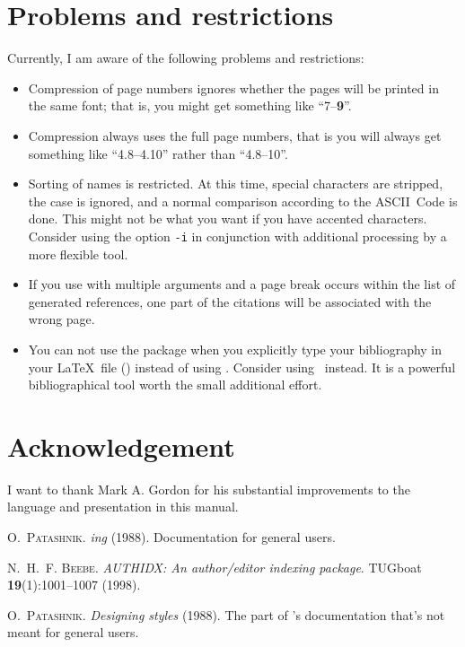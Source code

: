 \documentclass[a4paper]{article}
\newcommand{\cmdline}[1]{\texttt{#1}}
\newcommand{\option}[1]{\cmdline{#1}}
\newcommand{\ltxinp}[1]{\texttt{\string#1}}
\begin{document}
\section{Problems and restrictions}

Currently, I am aware of the following problems and restrictions:
\begin{itemize}
\item Compression of page numbers ignores whether the pages will be printed in
  the same font; that is, you might get something like ``7--\textbf{9}''.
\item Compression always uses the full page numbers, that is you will always
  get something like ``4.8--4.10'' rather than ``4.8--10''.
\item Sorting of names is restricted.  At this time, special characters are
  stripped, the case is ignored, and a normal comparison according to the
  ASCII~Code is done.  This might not be what you want if you have accented
  characters.  Consider using the option \option{-i} in conjunction with
  additional processing by a more flexible tool.
\item If you use \ltxinp{\aicite} with multiple arguments and a page break
  occurs within the list of generated references, one part of the citations
  will be associated with the wrong page.
\item You can not use the package when you explicitly type your bibliography in
  your \LaTeX\ file (\ltxinp{\bibitem}) instead of using \BibTeX. Consider
  using \BibTeX\ instead.  It is a powerful bibliographical tool worth the
  small additional effort.
\end{itemize}

\section{Acknowledgement}

I want to thank Mark A. Gordon for his substantial improvements to the language
and presentation in this manual.


\begin{thebibliography}{3}

\textsc{O.~Patashnik}.
\newblock \textit{{\BibTeX ing}} (1988).
\newblock Documentation for general {\BibTeX} users.

\textsc{N.~H.~F. Beebe}.
\newblock \textit{{AUTHIDX}: An author/editor indexing package}.
\newblock TUGboat \textbf{19}(1):1001--1007 (1998).

\textsc{O.~Patashnik}.
\newblock \textit{Designing {\BibTeX} styles} (1988).
\newblock The part of \BibTeX's documentation that's not meant for general
  users.

\end{thebibliography}
\end{document}
